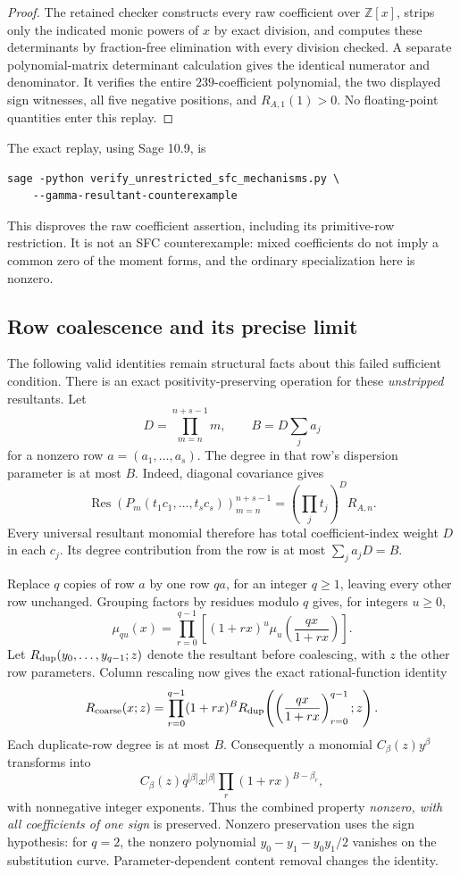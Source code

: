 \documentclass[11pt]{article}
\begin{document}
\begin{proof}
The retained checker constructs every raw coefficient over
$\mathbb Z[x]$, strips only the indicated monic powers of $x$ by
exact division, and computes these determinants by fraction-free
elimination with every division checked. A separate polynomial-matrix
determinant calculation gives the identical numerator and denominator.
It verifies the entire $239$-coefficient polynomial, the two displayed
sign witnesses, all five negative positions, and $R_{A,1}(1)>0$.
No floating-point quantities enter this replay.
\end{proof}

The exact replay, using Sage 10.9, is
\begin{verbatim}
sage -python verify_unrestricted_sfc_mechanisms.py \
    --gamma-resultant-counterexample
\end{verbatim}
This disproves the raw coefficient assertion, including its
primitive-row restriction. It is not an SFC counterexample:
mixed coefficients do not imply a common zero of the moment forms,
and the ordinary specialization here is nonzero.

\subsection{Row coalescence and its precise limit}
The following valid identities remain structural facts about this
failed sufficient condition.
There is an exact positivity-preserving operation for these
\emph{unstripped} resultants. Let
\[
 D=\prod_{m=n}^{n+s-1}m,\qquad B=D\sum_j a_j
\]
for a nonzero row $a=(a_1,\ldots,a_s)$. The degree in that row's
dispersion parameter is at most $B$. Indeed, diagonal covariance gives
\[
 \operatorname{Res}(P_m(t_1c_1,\ldots,t_sc_s))_{m=n}^{n+s-1}
       =\left(\prod_jt_j\right)^D R_{A,n}.
\]
Every universal resultant monomial therefore has total coefficient-index
weight $D$ in each $c_j$. Its degree contribution from the row is at most
$\sum_j a_jD=B$.

Replace $q$ copies of row $a$ by one row $qa$, for an integer $q\ge1$, leaving every other row
unchanged. Grouping factors by residues modulo $q$ gives, for integers $u\ge0$,
\[
 \mu_{qu}(x)=\prod_{r=0}^{q-1}
       \left[(1+rx)^u\mu_u\!\left(\frac{qx}{1+rx}\right)\right].
\]
Let $R_{\rm dup}(y_0,\ldots,y_{q-1};z)$ denote the resultant before
coalescing, with $z$ the other row parameters. Column rescaling now gives
the exact rational-function identity
\[
 R_{\rm coarse}(x;z)
 =\prod_{r=0}^{q-1}(1+rx)^B
 R_{\rm dup}\!\left(\left(\frac{qx}{1+rx}\right)_{r=0}^{q-1};z\right).
\]
Each duplicate-row degree is at most $B$. Consequently a monomial
$C_\beta(z)y^\beta$ transforms into
\[
 C_\beta(z)q^{|\beta|}x^{|\beta|}
           \prod_r(1+rx)^{B-\beta_r},
\]
with nonnegative integer exponents. Thus the combined property
\emph{nonzero, with all coefficients of one sign} is preserved.
Nonzero preservation uses the sign hypothesis: for $q=2$, the nonzero
polynomial $y_0-y_1-y_0y_1/2$ vanishes on the substitution curve.
Parameter-dependent content removal changes the identity.
\end{document}
